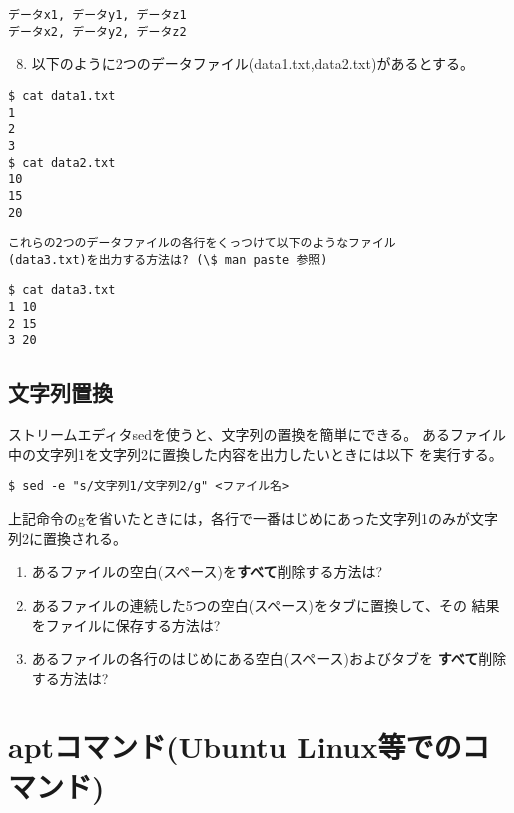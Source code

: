 \documentclass[11pt, twocolumn, ]{jsarticle}
\providecommand{\tightlist}{%
   \setlength{\itemsep}{0pt}\setlength{\parskip}{0pt}}
\begin{document}
\begin{lstlisting}
データx1, データy1, データz1
データx2, データy2, データz2
\end{lstlisting}

\begin{enumerate}
\setcounter{enumi}{7}
\tightlist
\item
  以下のように2つのデータファイル(data1.txt,data2.txt)があるとする。
\end{enumerate}

\begin{lstlisting}
$ cat data1.txt
1
2
3
$ cat data2.txt
10
15
20
\end{lstlisting}

\begin{lstlisting}
これらの2つのデータファイルの各行をくっつけて以下のようなファイル
(data3.txt)を出力する方法は? (\$ man paste 参照)
\end{lstlisting}

\begin{lstlisting}
$ cat data3.txt
1 10
2 15
3 20
\end{lstlisting}

\hypertarget{ux6587ux5b57ux5217ux7f6eux63db}{%
\subsection{文字列置換}\label{ux6587ux5b57ux5217ux7f6eux63db}}

ストリームエディタsedを使うと、文字列の置換を簡単にできる。
あるファイル中の文字列1を文字列2に置換した内容を出力したいときには以下
を実行する。

\begin{lstlisting}
$ sed -e "s/文字列1/文字列2/g" <ファイル名>
\end{lstlisting}

上記命令のgを省いたときには，各行で一番はじめにあった文字列1のみが文字
列2に置換される。

\begin{enumerate}
\item
  あるファイルの空白(スペース)を\textbf{すべて}削除する方法は?
\item
  あるファイルの連続した5つの空白(スペース)をタブに置換して、その
  結果をファイルに保存する方法は?
\item
  あるファイルの各行のはじめにある空白(スペース)およびタブを
  \textbf{すべて}削除する方法は?
\end{enumerate}

\hypertarget{aptux30b3ux30deux30f3ux30c9ubuntu-linuxux7b49ux3067ux306eux30b3ux30deux30f3ux30c9}{%
\section{aptコマンド(Ubuntu
Linux等でのコマンド)}\label{aptux30b3ux30deux30f3ux30c9ubuntu-linuxux7b49ux3067ux306eux30b3ux30deux30f3ux30c9}}
\end{document}
